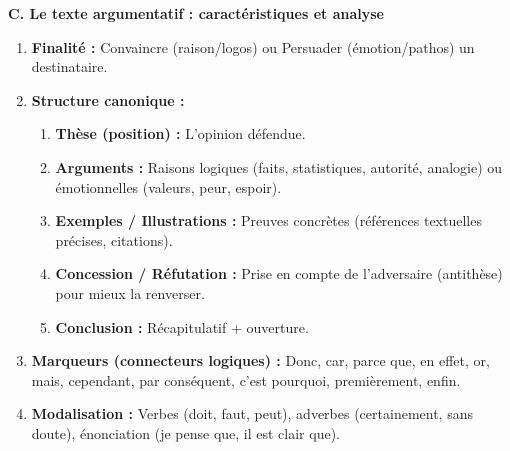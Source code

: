 \documentclass[11pt]{article}
\newcommand{\cle}[1]{{\popxbold\color{popdark}#1}}
\begin{document}
\begin{methode}
\textbf{C. Le texte argumentatif : caractéristiques et analyse}
\begin{enumerate}
    \item \textbf{Finalité :} Convaincre (raison/logos) ou Persuader (émotion/pathos) un destinataire.
    \item \textbf{Structure canonique :}
    \begin{enumerate}
        \item \textbf{Thèse (position) :} L'opinion défendue.
        \item \textbf{Arguments :} Raisons logiques (faits, statistiques, autorité, analogie) ou émotionnelles (valeurs, peur, espoir).
        \item \textbf{Exemples / Illustrations :} Preuves concrètes (références textuelles précises, citations).
        \item \textbf{Concession / Réfutation :} Prise en compte de l'adversaire (antithèse) pour mieux la renverser.
        \item \textbf{Conclusion :} Récapitulatif + ouverture.
    \end{enumerate}
    \item \textbf{Marqueurs (connecteurs logiques) :} \cle{Donc, car, parce que, en effet, or, mais, cependant, par conséquent, c'est pourquoi, premièrement, enfin}.
    \item \textbf{Modalisation :} Verbes (doit, faut, peut), adverbes (certainement, sans doute), énonciation (je pense que, il est clair que).
\end{enumerate}
\end{methode}
\end{document}
